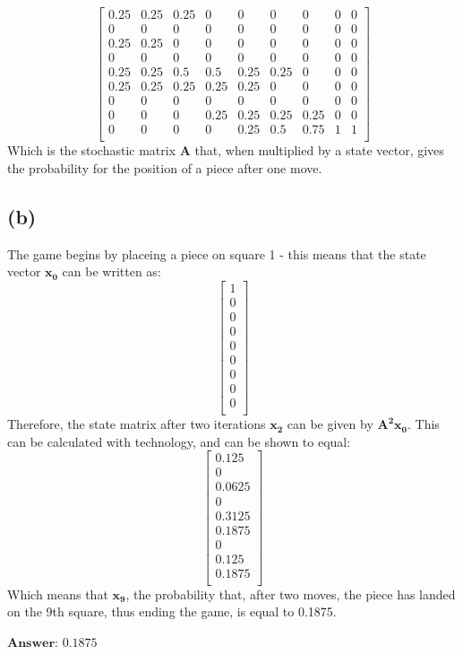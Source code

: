\documentclass[11pt]{article}
\begin{document}
$$\begin{bmatrix}
0.25 & 0.25 & 0.25 & 0    & 0    & 0    & 0    & 0 & 0\\
0    & 0    & 0    & 0    & 0    & 0    & 0    & 0 & 0\\
0.25 & 0.25 & 0    & 0    & 0    & 0    & 0    & 0 & 0\\
0    & 0    & 0    & 0    & 0    & 0    & 0    & 0 & 0\\
0.25 & 0.25 & 0.5  & 0.5  & 0.25 & 0.25 & 0    & 0 & 0\\
0.25 & 0.25 & 0.25 & 0.25 & 0.25 & 0    & 0    & 0 & 0\\
0    & 0    & 0    & 0    & 0    & 0    & 0    & 0 & 0\\
0    & 0    & 0    & 0.25 & 0.25 & 0.25 & 0.25 & 0 & 0\\
0    & 0    & 0    & 0    & 0.25 & 0.5  & 0.75 & 1 & 1\\
\end{bmatrix}$$
Which is the stochastic matrix $\mathbf{A}$ that, when multiplied by a state vector, gives the probability for the position of a piece after one move.
\subsection*{(b)}
The game begins by placeing a piece on square 1 - this means that the state vector $\mathbf{x_0}$ can be written as: $$\begin{bmatrix}
1 \\
0 \\
0 \\
0 \\
0 \\
0 \\
0 \\
0 \\
0 \\
\end{bmatrix}$$
Therefore, the state matrix after two iterations $\mathbf{x_2}$ can be given by $\mathbf{A^2x_0}$. This can be calculated with technology, and can be shown to equal:
$$\begin{bmatrix}
0.125 \\
0 \\
0.0625 \\
0 \\
0.3125 \\
0.1875 \\
0 \\
0.125 \\
0.1875 \\
\end{bmatrix}$$
Which means that $\mathbf{x_9}$, the probability that, after two moves, the piece has landed on the 9th square, thus ending the game, is equal to 0.1875.\\\\
$\textbf{Answer: } 0.1875$
\end{document}
